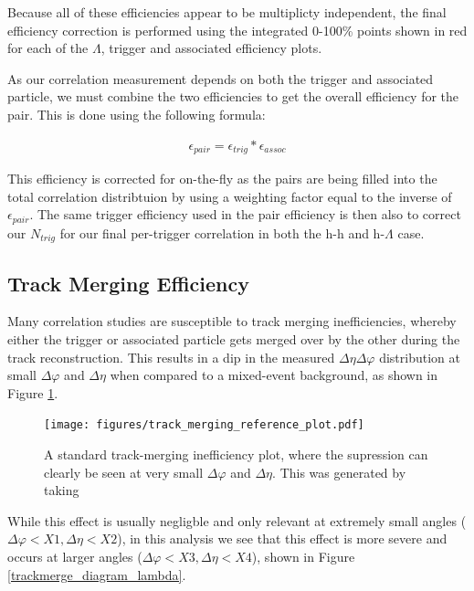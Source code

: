\documentclass[ALICE,manyauthors]{ALICE_analysis_notes}
\begin{document}
Because all of these efficiencies appear to be multiplicty independent, the final efficiency correction is performed using the integrated 0-100\% points shown in red for each of the $\Lambda$, trigger and associated efficiency plots.

As our correlation measurement depends on both the trigger and associated particle, we must combine the two efficiencies to get the overall efficiency for the pair.  This is done using the following formula:

\begin{align*}
    \epsilon_{pair} = \epsilon_{trig}*\epsilon_{assoc}
\end{align*}

This efficiency is corrected for on-the-fly as the pairs are being filled into the total correlation distribtuion by using a weighting factor equal to the inverse of $\epsilon_{pair}$. The same trigger efficiency used in the pair efficiency is then also to correct our $N_{trig}$ for our final per-trigger correlation in both the h-h and h-$\Lambda$ case.

\subsection{Track Merging Efficiency} 
\label{trackmerge_efficiency}

Many correlation studies are susceptible to track merging inefficiencies, whereby either the trigger or associated particle gets merged over by the other during the track reconstruction. This results in a dip in the measured $\Delta\eta\Delta\varphi$ distribution at small $\Delta\varphi$ and $\Delta\eta$ when compared to a mixed-event background, as shown in Figure \ref{trackmerge_diagram_reference}.


\begin{figure}[ht]
\centering
\texttt{[image: figures/track\_merging\_reference\_plot.pdf]}
\caption{A standard track-merging inefficiency plot, where the supression can clearly be seen at very small $\Delta\varphi$ and $\Delta\eta$. This was generated by taking }
\label{trackmerge_diagram_reference}
\end{figure}


While this effect is usually negligble and only relevant at extremely small angles ($\Delta\varphi < X1, \Delta\eta < X2$), in this analysis we see that this effect is more severe and occurs at larger angles ($\Delta\varphi < X3, \Delta\eta < X4$), shown in Figure \ref{trackmerge_diagram_lambda}. 
\end{document}

